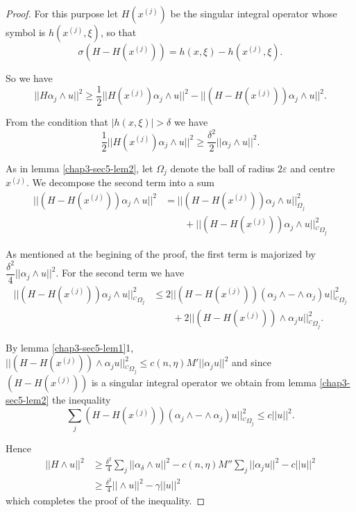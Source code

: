\begin{proof}
For this purpose let $H(x^{(j)})$ be the singular integral operator
whose symbol is $h(x^{(j)}, \xi)$, so that  
$$
\sigma (H-H(x^{(j)})) = h (x, \xi ) - h(x^{(j)}, \xi). 
$$

So we have  
$$
||H \alpha_j \wedge u ||^2 \geq \frac{1}{2} || H (x^{(j) }) \alpha_j
\wedge u ||^2 - ||(H - H(x^{(j)})) \alpha_j \wedge u ||^2. 
$$ 

From the condition that $|h(x, \xi) | > \delta $ we have 
$$
\frac{1}{2} || H(x^{(j)}) \alpha_j \wedge u ||^2 \geq
\frac{\delta^2}{2}|| \alpha_j \wedge u ||^2.  
$$

As in lemma \ref{chap3-sec5-lem2}, let $\Omega_j$ denote the ball of radius $2
\varepsilon$ and centre $x^{(j)}$.  
We decompose the second term into a sum 
\begin{align*}
||(H-H(x^{(j)})) \alpha_j \wedge u ||^2 & = || (H-H(x^{(j)})) \alpha_j
\wedge u||^2_{\Omega_{j}} \\
& \qquad + || (H-H(x^{(j)})) \alpha_j \wedge u||^2_{{}^C\Omega_j} 
\end{align*}

As mentioned at the begining of the proof, the first term is majorized
by $\dfrac{\delta^2}{4}||\alpha_j \wedge u ||^2$. For the second term
we have  
\begin{align*}
||(H-H(x^{(j)})) \alpha_j \wedge u ||^2_{{}^C\Omega_j} & \leq 2 ||
(H-H(x^{(j)})) (\alpha_j \wedge - \wedge \alpha_j ) u
||^2_{{}^C\Omega_j}\\
& \qquad  + 2 ||(H-H(x^{(j)})) \wedge \alpha_j u ||^2_{{}^C \Omega_j}. 
\end{align*}

By lemma \ref{chap3-sec5-lem1}1,\pageoriginale $||(H-H(x^{(j)} ))
\wedge \alpha_j u 
||^2_{{}^C\Omega_j} \leq c (n, \eta ) M' ||\alpha_j u ||^2 $ and since
$(H-H(x^{(j)}))$ is a singular integral operator we obtain from lemma
\ref{chap3-sec5-lem2} the inequality   
$$
 \sum\limits_{j} (H-H(x^{(j)})) (\alpha_j \wedge - \wedge \alpha_j )
 u ||^2 _{{}^C\Omega_j} \leq c ||u||^2. 
$$

Hence 
\begin{align*}
|| H \wedge u||^2 & \geq \frac{\delta^2}{4}\sum_j ||\alpha_\delta
\wedge u ||^2 - c(n,\eta) M'' \sum_j ||\alpha_j u ||^2 - c ||u||^2 \\ 
& \geq \frac{\delta^2}{4}||\wedge u ||^2 - \gamma || u ||^ 2  
\end{align*} 
which completes the proof of the inequality. 
\end{proof}

